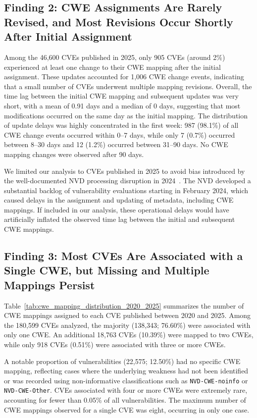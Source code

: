 \documentclass[conference,compsoc]{IEEEtran}
\begin{document}
\subsection{Finding 2: CWE Assignments Are Rarely Revised, and Most Revisions Occur Shortly After Initial Assignment}

Among the 46,600 CVEs published in 2025, only 905 CVEs (around 2\%) experienced at least one change to their CWE mapping after the initial assignment. These updates accounted for 1,006 CWE change events, indicating that a small number of CVEs underwent multiple mapping revisions. Overall, the time lag between the initial CWE mapping and subsequent updates was very short, with a mean of 0.91 days and a median of 0 days, suggesting that most modifications occurred on the same day as the initial mapping. The distribution of update delays was highly concentrated in the first week: 987 (98.1\%) of all CWE change events occurred within 0–7 days, while only 7 (0.7\%) occurred between 8–30 days and 12 (1.2\%) occurred between 31–90 days. No CWE mapping changes were observed after 90 days. 

We limited our analysis to CVEs published in 2025 to avoid bias introduced by the well-documented NVD processing disruption in 2024~\cite{NVD2024Backlog,NIST2026NVD}. The NVD developed a substantial backlog of vulnerability evaluations starting in February 2024, which caused delays in the assignment and updating of metadata, including CWE mappings. If included in our analysis, these operational delays would have artificially inflated the observed time lag between the initial and subsequent CWE mappings.


\subsection{Finding 3: Most CVEs Are Associated with
a Single CWE, but Missing and Multiple Mappings Persist}

Table~\ref{tab:cwe_mapping_distribution_2020_2025} summarizes the number of CWE mappings assigned to each CVE published between 2020 and 2025. Among the 180,599 CVEs analyzed, the majority (138,343; 76.60\%) were associated with only one CWE. An additional 18,763 CVEs (10.39\%) were mapped to two CWEs, while only 918 CVEs (0.51\%) were associated with three or more CWEs.

A notable proportion of vulnerabilities (22,575; 12.50\%) had no specific CWE mapping, reflecting cases where the underlying weakness had not been identified or was recorded using non-informative classifications such as \texttt{NVD-CWE-noinfo} or \texttt{NVD-CWE-Other}. CVEs associated with four or more CWEs were extremely rare, accounting for fewer than 0.05\% of all vulnerabilities. The maximum number of CWE mappings observed for a single CVE was eight, occurring in only one case.
\end{document}
